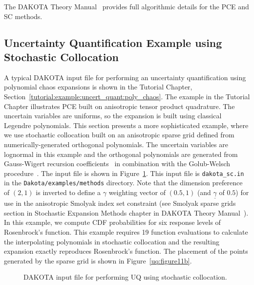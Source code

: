 The DAKOTA Theory Manual~\cite{TheoMan} provides full algorithmic
details for the PCE and SC methods.


\subsection{Uncertainty Quantification Example using Stochastic Collocation}\label{uq:uncertainty2}

A typical DAKOTA input file for performing an uncertainty
quantification using polynomial chaos expansions is shown in the
Tutorial Chapter,
Section~\ref{tutorial:example:uncert_quant:poly_chaos}.  The example
in the Tutorial Chapter illustrates PCE built on anisotropic tensor
product quadrature.  The uncertain variables are uniforms, so the
expansion is built using classical Legendre polynomials. This section
presents a more sophisticated example, where we use stochastic
collocation built on an anisotropic sparse grid defined from
numerically-generated orthogonal polynomials.  The uncertain variables
are lognormal in this example and the orthogonal polynomials are
generated from Gauss-Wigert recursion coefficients~\cite{simpson_gw}
in combination with the Golub-Welsch procedure~\cite{GolubWelsch69}.
The input file is shown in Figure~\ref{uq:figure11}. This input file
is \texttt{dakota\_sc.in} in the \texttt{Dakota/examples/methods}
directory.  Note that the dimension preference of $(2,1)$ is inverted
to define a $\gamma$ weighting vector of $(0.5,1)$ (and
$\underline{\gamma}$ of $0.5$) for use in the anisotropic Smolyak
index set constraint (see Smolyak sparse grids section in Stochastic
Expansion Methods chapter in DAKOTA Theory Manual~\cite{TheoMan}).  In
this example, we compute CDF probabilities for six response levels of
Rosenbrock's function.  This example requires 19 function evaluations
to calculate the interpolating polynomials in stochastic collocation
and the resulting expansion exactly reproduces Rosenbrock's function.
The placement of the points generated by the sparse grid is shown in
Figure~\ref{uq:figure11b}.

\begin{figure}
  \centering
  \begin{bigbox}
    \begin{small}
    \end{small}
  \end{bigbox}
\caption{DAKOTA input file for performing UQ using stochastic collocation.}
\label{uq:figure11}
\end{figure}

